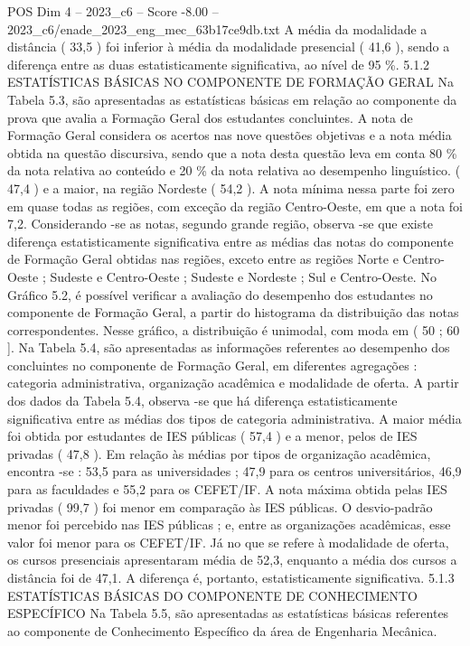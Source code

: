 \begin{textsample}{POS Dim 4 – 2023\_c6 – Score -8.00 – 2023\_c6/enade\_2023\_eng\_mec\_63b17ce9db.txt}
A média da modalidade a distância ( 33,5 ) foi inferior à média da modalidade presencial ( 41,6 ), sendo a diferença entre as duas estatisticamente significativa, ao nível de 95 \%. 5.1.2 ESTATÍSTICAS BÁSICAS NO COMPONENTE DE FORMAÇÃO GERAL Na Tabela 5.3, são apresentadas as estatísticas básicas em relação ao componente da prova que avalia a Formação Geral dos estudantes concluintes.
A nota de Formação Geral considera os acertos nas nove questões objetivas e a nota média obtida na questão discursiva, sendo que a nota desta questão leva em conta 80 \% da nota relativa ao conteúdo e 20 \% da nota relativa ao desempenho linguístico. ( 47,4 ) e a maior, na região Nordeste ( 54,2 ).
A nota mínima nessa parte foi zero em quase todas as regiões, com exceção da região Centro-Oeste, em que a nota foi 7,2.
Considerando -se as notas, segundo grande região, observa -se que existe diferença estatisticamente significativa entre as médias das notas do componente de Formação Geral obtidas nas regiões, exceto entre as regiões Norte e Centro-Oeste ; Sudeste e Centro-Oeste ; Sudeste e Nordeste ; Sul e Centro-Oeste.
No Gráfico 5.2, é possível verificar a avaliação do desempenho dos estudantes no componente de Formação Geral, a partir do histograma da distribuição das notas correspondentes.
Nesse gráfico, a distribuição é unimodal, com moda em ( 50 ; 60 ].
Na Tabela 5.4, são apresentadas as informações referentes ao desempenho dos concluintes no componente de Formação Geral, em diferentes agregações : categoria administrativa, organização acadêmica e modalidade de oferta.
A partir dos dados da Tabela 5.4, observa -se que há diferença estatisticamente significativa entre as médias dos tipos de categoria administrativa.
A maior média foi obtida por estudantes de IES públicas ( 57,4 ) e a menor, pelos de IES privadas ( 47,8 ).
Em relação às médias por tipos de organização acadêmica, encontra -se : 53,5 para as universidades ; 47,9 para os centros universitários, 46,9 para as faculdades e 55,2 para os CEFET/IF.
A nota máxima obtida pelas IES privadas ( 99,7 ) foi menor em comparação às IES públicas.
O desvio-padrão menor foi percebido nas IES públicas ; e, entre as organizações acadêmicas, esse valor foi menor para os CEFET/IF.
Já no que se refere à modalidade de oferta, os cursos presenciais apresentaram média de 52,3, enquanto a média dos cursos a distância foi de 47,1.
A diferença é, portanto, estatisticamente significativa. 5.1.3 ESTATÍSTICAS BÁSICAS DO COMPONENTE DE CONHECIMENTO ESPECÍFICO Na Tabela 5.5, são apresentadas as estatísticas básicas referentes ao componente de Conhecimento Específico da área de Engenharia Mecânica.

\end{textsample}
